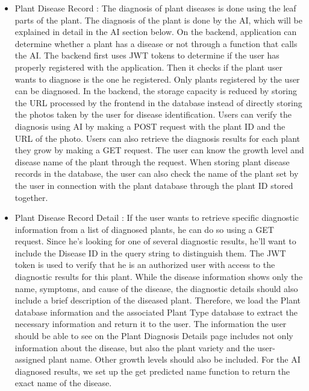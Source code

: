 \documentclass[conference, a4paper]{IEEEtran}
\begin{document}
\begin{enumerate}
\begin{itemize}
\begin{itemize}
\begin{itemize}
            \item Plant Disease Record : The diagnosis of plant diseases is done using the leaf parts of the plant. The diagnosis of the plant is done by the AI, which will be explained in detail in the AI section below. On the backend, application can determine whether a plant has a disease or not through a function that calls the AI. The backend first uses JWT tokens to determine if the user has properly registered with the application. Then it checks if the plant user wants to diagnose is the one he registered. Only plants registered by the user can be diagnosed. In the backend, the storage capacity is reduced by storing the URL processed by the frontend in the database instead of directly storing the photos taken by the user for disease identification. Users can verify the diagnosis using AI by making a POST request with the plant ID and the URL of the photo. Users can also retrieve the diagnosis results for each plant they grow by making a GET request. The user can know the growth level and disease name of the plant through the request. When storing plant disease records in the database, the user can also check the name of the plant set by the user in connection with the plant database through the plant ID stored together. \\
            \item Plant Disease Record Detail : If the user wants to retrieve specific diagnostic information from a list of diagnosed plants, he can do so using a GET request. Since he's looking for one of several diagnostic results, he'll want to include the Disease ID in the query string to distinguish them. The JWT token is used to verify that he is an authorized user with access to the diagnostic results for this plant. While the disease information shows only the name, symptoms, and cause of the disease, the diagnostic details should also include a brief description of the diseased plant. Therefore, we load the Plant database information and the associated Plant Type database to extract the necessary information and return it to the user. The information the user should be able to see on the Plant Diagnosis Details page includes not only information about the disease, but also the plant variety and the user-assigned plant name. Other growth levels should also be included. For the AI diagnosed results, we set up the get predicted name function to return the exact name of the disease.
        \end{itemize}
    \end{itemize}
    \end{itemize}
\end{enumerate}
\end{document}
